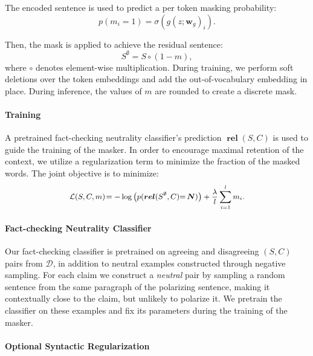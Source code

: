 \documentclass[letterpaper]{article} %
\DeclareMathOperator{\rel}{\boldsymbol{rel}}
\DeclareMathOperator{\N}{\boldsymbol{N}}
\begin{document}
The encoded sentence is used to predict a per token masking probability:
\begin{equation}
	p(m_i = 1) = \sigma(g(z; \boldsymbol{w}_g)_i).
\label{eq:mask_prob}
\end{equation}

Then, the mask is applied to achieve the residual sentence:
\begin{equation}
    S^{\emptyset} = S \circ (1-m),
\end{equation}
where $\circ$ denotes element-wise multiplication. During training, we perform soft deletions over the token embeddings and add the out-of-vocabulary embedding in place. During inference, the values of $m$ are rounded to create a discrete mask.



\paragraph{Training}
A pretrained fact-checking neutrality classifier's prediction $\rel(S,C)$ is used to guide the training of the masker. In order to encourage maximal retention of the context, we utilize a regularization term to minimize the fraction of the masked words. The joint objective is to minimize:
\begin{equation}
    \small{
    \mathcal{L}(S,C,m)\!= - \log \left(p(\rel(S^\emptyset,C){=}\N)\right) + \frac{\lambda}{l} \sum_{i=1}^{l} m_i.
    }
\label{eq:mask_gen_loss} 
\end{equation}


\paragraph{Fact-checking Neutrality Classifier} \label{sec:neutral_classifier}
 Our fact-checking classifier is pretrained on agreeing and disagreeing $(S,C)$ pairs from $\mathcal{D}$, in addition to neutral examples constructed through negative sampling. For each claim we construct a \textit{neutral} pair by sampling a random sentence from the same paragraph of the polarizing sentence, making it contextually close to the claim, but unlikely to polarize it. We pretrain the classifier on these examples and fix its parameters during the training of the masker.



\paragraph{Optional Syntactic Regularization}
\end{document}
